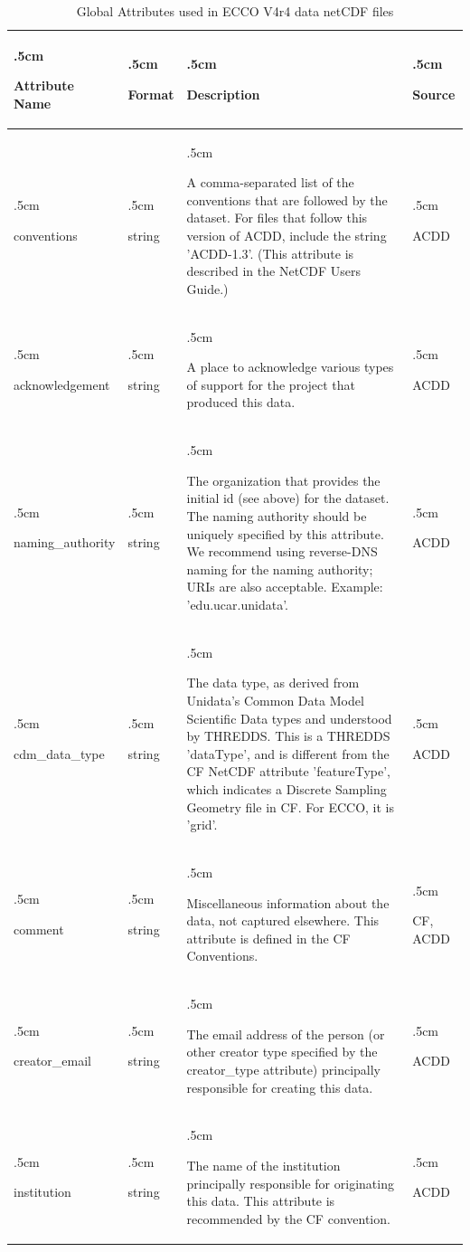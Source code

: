 \begin{longtable}{>{\hangindent.5cm\hangafter=1\raggedright}p{3cm}
                    >{\hangindent.5cm\hangafter=1\raggedright}p{3cm}
                    >{\hangindent.5cm\hangafter=1\raggedright}p{3cm}
                    >{\hangindent.5cm\hangafter=1\raggedright}p{3cm}}
\caption{Global Attributes used in ECCO V4r4 data netCDF files}
\label{tab:variable-attributes} \\ 
\hline \endhead
\hline \endfoot
\rowcolor{blue!25} \textbf{Attribute Name} & \textbf{Format} & \textbf{Description} & \textbf{Source} \\ \hline
\rowcolor{cyan!25}
conventions & string & A comma-separated list of the conventions that are followed by the dataset. For files that follow this version of ACDD, include the string 'ACDD-1.3'. (This attribute is described in the NetCDF Users Guide.) & ACDD \\ \hline
\rowcolor{cyan!25}
acknowledgement & string & A place to acknowledge various types of support for the project that produced this data. & ACDD \\ \hline
\rowcolor{cyan!25}
naming\_authority & string & 	The organization that provides the initial id (see above) for the dataset. The naming authority should be uniquely specified by this attribute. We recommend using reverse-DNS naming for the naming authority; URIs are also acceptable. Example: 'edu.ucar.unidata'. & ACDD \\ \hline
\rowcolor{cyan!25}
cdm\_data\_type & string & The data type, as derived from Unidata's Common Data Model Scientific Data types and understood by THREDDS. This is a THREDDS 'dataType', and is different from the CF NetCDF attribute 'featureType', which indicates a Discrete Sampling Geometry file in CF. For ECCO, it is 'grid'. & ACDD \\ \hline
\rowcolor{cyan!25}
comment & string & Miscellaneous information about the data, not captured elsewhere. This attribute is defined in the CF Conventions. & CF, ACDD \\ \hline
\rowcolor{cyan!25}
creator\_email & string & The email address of the person (or other creator type specified by the creator\_type attribute) principally responsible for creating this data. & ACDD \\ \hline
\rowcolor{cyan!25}
institution & string & The name of the institution principally responsible for originating this data. This attribute is recommended by the CF convention. & ACDD \\ \hline

\end{longtable}
